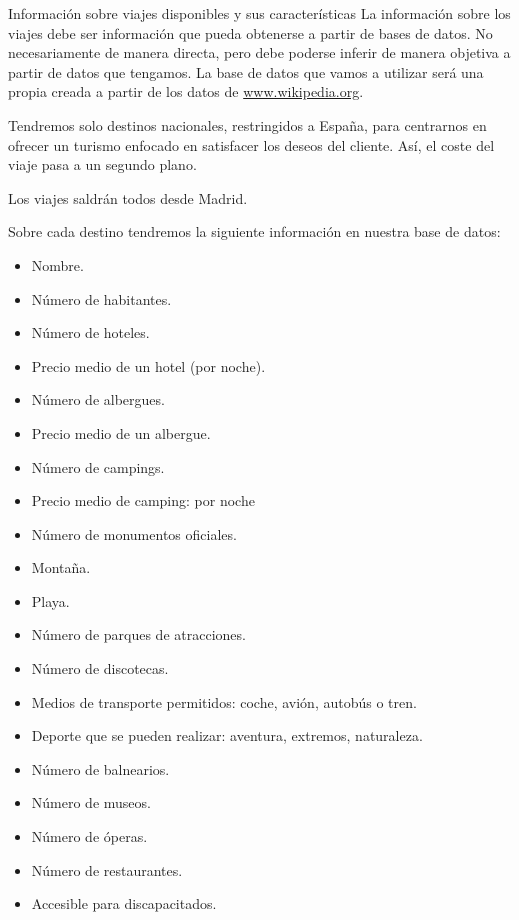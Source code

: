 \documentclass[11pt, a4paper, spanish, openright, twoside]{book}
\begin{document}
	\newpage
	\begin{section}{Información sobre viajes disponibles y sus características}
		La información sobre los viajes debe ser información que pueda obtenerse a partir de bases de datos. No necesariamente de manera directa, pero debe poderse inferir de manera objetiva 
		a partir de datos que tengamos. La base de datos que vamos a utilizar será una propia creada a partir de los datos de \url{www.wikipedia.org}. 
		
		Tendremos solo destinos nacionales, restringidos a España, para centrarnos en ofrecer un turismo enfocado en satisfacer los deseos del cliente. Así, el coste del viaje pasa a un segundo plano.
		
		Los viajes saldrán todos desde Madrid.
		
		Sobre cada destino tendremos la siguiente información en nuestra base de datos:
			\begin{itemize}
				\item Nombre.
				\item Número de habitantes.
				\item Número de hoteles.
				\item Precio medio de un hotel (por noche).
				\item Número de albergues.
				\item Precio medio de un albergue.
				\item Número de campings.
				\item Precio medio de camping: por noche
				\item Número de monumentos oficiales.
				\item Montaña.
				\item Playa.
				\item Número de parques de atracciones.
				\item Número de discotecas.
				\item Medios de transporte permitidos: coche, avión, autobús o tren.
				\item Deporte que se pueden realizar: aventura, extremos, naturaleza.
				\item Número de balnearios. 
				\item Número de museos.
				\item Número de óperas.
				\item Número de restaurantes.
				\item Accesible para discapacitados.
				
						
			\end{itemize}
			

\end{section}
\end{document}
